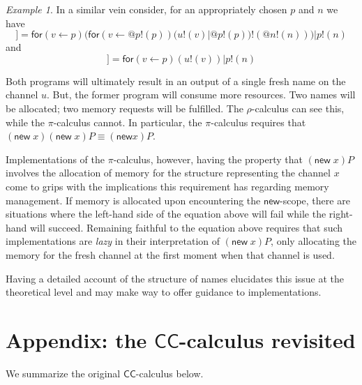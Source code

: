 \documentclass[submission,copyright,creativecommons]{eptcs}
\makeatletter
\newcommand{\new}{\mathsf{new}}
\newcommand{\pic}{$\pi$-calculus}
\newcommand{\ccomb}{$\mathsf{CC}$-calculus}
\newcommand{\ldb}{[\![}
\newcommand{\rdb}{]\!]}
\newcommand{\quotep}[1]{\mathsf{@}#1}
\newcommand{\meaningof}[1]{\ldb #1 \rdb}
\newcommand{\bc}{\mathbin{\mathbf{::=}}}
\newcommand{\bm}{\mathbin{\mathbf\mid}}
\newcommand{\rhoc}{$\rho$-calculus}
\theoremstyle{definition}
\theoremstyle{remark}
\theoremstyle{remark}
\newtheorem{example}{Example}
\makeatother
\begin{document}
\begin{example}
	In a similar vein consider, for an appropriately chosen $p$ and $n$ we have
	\begin{equation*}
		\meaningof{(\mathsf{new}\;v)(\mathsf{new}\;v) u!(v)} = \mathsf{for}(v \leftarrow p)(\mathsf{for}({v} \leftarrow {\quotep{p!(p)}})(u!(v)|\quotep{p!(p)})!(\quotep{n!(n)})) | p!(n)
	\end{equation*}
	and
	\begin{equation*}
		\meaningof{(\mathsf{new}\;v)u!(v)} = \mathsf{for}(v \leftarrow p)(u!(v) )|p!(n)
	\end{equation*}

	Both programs will ultimately result in an output of a single
	fresh name on the channel $u$. But, the former program will
	consume more resources. Two names will be allocated; two memory
	requests will be fulfilled. The {\rhoc} can see this, while the
	{\pic} cannot. In particular, the {\pic} requires that
	$(\mathsf{new}\;x)(\mathsf{new}\;x)P \equiv (\mathsf{new} x)P$.

	Implementations of the {\pic}, however, having the property that
	$(\mathsf{new}\;x)P$ involves the allocation of memory for the
	structure representing the channel $x$ come to grips with the
	implications this requirement has regarding memory management. If
	memory is allocated upon encountering the $\mathsf{new}$-scope, there are
	situations where the left-hand side of the equation above will
	fail while the right-hand will succeed. Remaining faithful to the
	equation above requires that such implementations are
	\textit{lazy} in their interpretation of $(\mathsf{new}\;x)P$, only
	allocating the memory for the fresh channel at the first moment
	when that channel is used.

	Having a detailed account of the structure of names elucidates
	this issue at the theoretical level and may make way to offer
	guidance to implementations.
\end{example}

\section{Appendix: the {\ccomb} revisited} \label{appendix:ccomb}
We summarize the original {\ccomb} \cite{DBLP:journals/tcs/Yoshida02} below.

\end{document}

